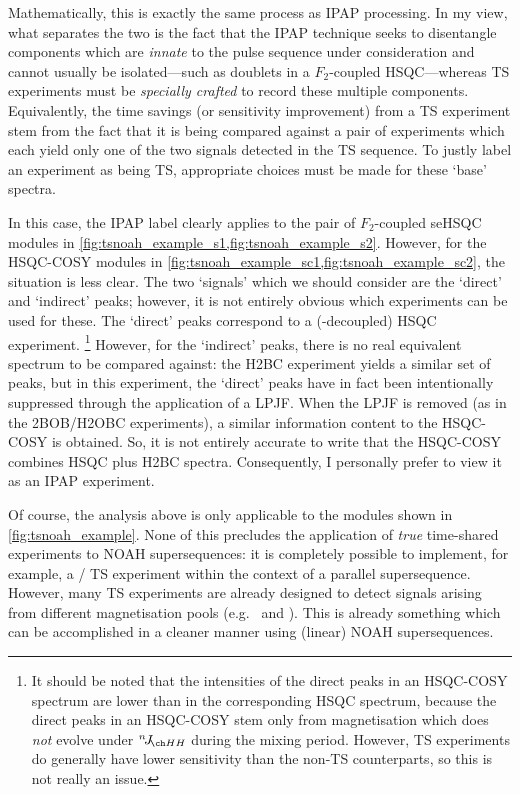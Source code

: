 Mathematically, this is exactly the same process as IPAP processing.
In my view, what separates the two is the fact that the IPAP technique seeks to disentangle components which are \textit{innate} to the pulse sequence under consideration and cannot usually be isolated---such as doublets in a $F_2$-coupled HSQC---whereas TS experiments must be \textit{specially crafted} to record these multiple components.
Equivalently, the time savings (or sensitivity improvement) from a TS experiment stem from the fact that it is being compared against a pair of experiments which each yield only one of the two signals detected in the TS sequence.
To justly label an experiment as being TS, appropriate choices must be made for these `base' spectra.

In this case, the IPAP label clearly applies to the pair of $F_2$-coupled seHSQC modules in \cref{fig:tsnoah_example_s1,fig:tsnoah_example_s2}.
However, for the HSQC-COSY modules in \cref{fig:tsnoah_example_sc1,fig:tsnoah_example_sc2}, the situation is less clear.
The two `signals' which we should consider are the `direct' and `indirect' peaks; however, it is not entirely obvious which experiments can be used for these.
The `direct' peaks correspond to a (\carbon{}-decoupled) HSQC experiment.%
\footnote{It should be noted that the intensities of the direct peaks in an HSQC-COSY spectrum are lower than in the corresponding HSQC spectrum, because the direct peaks in an HSQC-COSY stem only from magnetisation which does \textit{not} evolve under $\nJ{HH}$ during the mixing period. However, TS experiments do generally have lower sensitivity than the non-TS counterparts, so this is not really an issue.}
However, for the `indirect' peaks, there is no real equivalent spectrum to be compared against: the H2BC experiment\autocite{Nyberg2005JACS,Nyberg2005MRC} yields a similar set of peaks, but in this experiment, the `direct' peaks have in fact been intentionally suppressed through the application of a LPJF.
When the LPJF is removed (as in the 2BOB/H2OBC experiments\autocite{Kupce2017MRC}), a similar information content to the HSQC-COSY is obtained.
So, it is not entirely accurate to write that the HSQC-COSY combines HSQC plus H2BC spectra.
Consequently, I personally prefer to view it as an IPAP experiment.

Of course, the analysis above is only applicable to the modules shown in \cref{fig:tsnoah_example}.
None of this precludes the application of \textit{true} time-shared experiments to NOAH supersequences: it is completely possible to implement, for example, a \carbon{}/\nitrogen{} TS experiment within the context of a parallel supersequence.
However, many TS experiments are already designed to detect signals arising from different magnetisation pools (e.g.\  and ).
This is already something which can be accomplished in a cleaner manner using (linear) NOAH supersequences.



